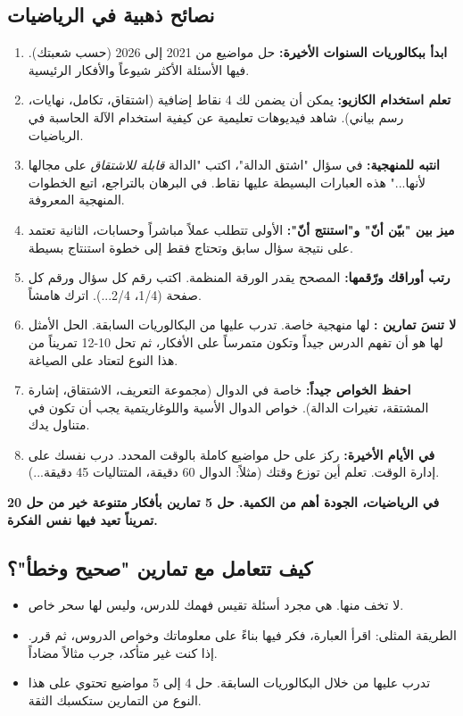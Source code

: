 \documentclass[12pt,a4paper]{book}
\newcommand{\importantAr}[1]{%
	\begin{important}
		\bfseries #1
	\end{important}
}
\begin{document}
	\subsection{نصائح ذهبية في الرياضيات}
	\label{sec:random-tips8}
	\begin{enumerate}
		\item \textbf{ابدأ ببكالوريات السنوات الأخيرة:} حل مواضيع من 2021 إلى 2026 (حسب شعبتك). فيها الأسئلة الأكثر شيوعاً والأفكار الرئيسية.
		\item \textbf{تعلم استخدام الكازيو:} يمكن أن يضمن لك 4 نقاط إضافية (اشتقاق، تكامل، نهايات، رسم بياني). شاهد فيديوهات تعليمية عن كيفية استخدام الآلة الحاسبة في الرياضيات.
		\item \textbf{انتبه للمنهجية:} في سؤال "اشتق الدالة"، اكتب "الدالة \textit{قابلة للاشتقاق} على مجالها لأنها..." هذه العبارات البسيطة عليها نقاط. في البرهان بالتراجع، اتبع الخطوات المنهجية المعروفة.
		\item \textbf{ميز بين "بيّن أنّ" و"استنتج أنّ":} الأولى تتطلب عملاً مباشراً وحسابات، الثانية تعتمد على نتيجة سؤال سابق وتحتاج فقط إلى خطوة استنتاج بسيطة.
		\item \textbf{رتب أوراقك ورّقمها:} المصحح يقدر الورقة المنظمة. اكتب رقم كل سؤال ورقم كل صفحة (1/4، 2/4...). اترك هامشاً.
		\item \textbf{لا تنسَ تمارين :} لها منهجية خاصة. تدرب عليها من البكالوريات السابقة. الحل الأمثل لها هو أن تفهم الدرس جيداً وتكون متمرساً على الأفكار، ثم تحل 10-12 تمريناً من هذا النوع لتعتاد على الصياغة.
		\item \textbf{احفظ الخواص جيداً:} خاصة في الدوال (مجموعة التعريف، الاشتقاق، إشارة المشتقة، تغيرات الدالة). خواص الدوال الأسية واللوغاريتمية يجب أن تكون في متناول يدك.
		\item \textbf{في الأيام الأخيرة:} ركز على حل مواضيع كاملة بالوقت المحدد. درب نفسك على إدارة الوقت. تعلم أين توزع وقتك (مثلاً: الدوال 60 دقيقة، المتتاليات 45 دقيقة...).
	\end{enumerate}
	
	\importantAr{في الرياضيات، الجودة أهم من الكمية. حل 5 تمارين بأفكار متنوعة خير من حل 20 تمريناً تعيد فيها نفس الفكرة.}
	
	\subsection{كيف تتعامل مع تمارين "صحيح وخطأ"؟}
	\begin{itemize}
		\item لا تخف منها. هي مجرد أسئلة تقيس فهمك للدرس، وليس لها سحر خاص.
		\item الطريقة المثلى: اقرأ العبارة، فكر فيها بناءً على معلوماتك وخواص الدروس، ثم قرر. إذا كنت غير متأكد، جرب مثالاً مضاداً.
		\item تدرب عليها من خلال البكالوريات السابقة. حل 4 إلى 5 مواضيع تحتوي على هذا النوع من التمارين ستكسبك الثقة.
	\end{itemize}
	
\end{document}
